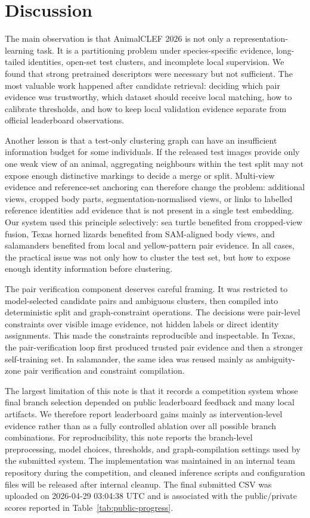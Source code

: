 \documentclass{ceurart}
\begin{document}
\section{Discussion}
The main observation is that AnimalCLEF 2026 is not only a representation-learning task. It is a partitioning problem under species-specific evidence, long-tailed identities, open-set test clusters, and incomplete local supervision. We found that strong pretrained descriptors were necessary but not sufficient. The most valuable work happened after candidate retrieval: deciding which pair evidence was trustworthy, which dataset should receive local matching, how to calibrate thresholds, and how to keep local validation evidence separate from official leaderboard observations.

Another lesson is that a test-only clustering graph can have an insufficient information budget for some individuals. If the released test images provide only one weak view of an animal, aggregating neighbours within the test split may not expose enough distinctive markings to decide a merge or split. Multi-view evidence and reference-set anchoring can therefore change the problem: additional views, cropped body parts, segmentation-normalised views, or links to labelled reference identities add evidence that is not present in a single test embedding. Our system used this principle selectively: sea turtle benefited from cropped-view fusion, Texas horned lizards benefited from SAM-aligned body views, and salamanders benefited from local and yellow-pattern pair evidence. In all cases, the practical issue was not only how to cluster the test set, but how to expose enough identity information before clustering.

The pair verification component deserves careful framing. It was restricted to model-selected candidate pairs and ambiguous clusters, then compiled into deterministic split and graph-constraint operations. The decisions were pair-level constraints over visible image evidence, not hidden labels or direct identity assignments. This made the constraints reproducible and inspectable. In Texas, the pair-verification loop first produced trusted pair evidence and then a stronger self-training set. In salamander, the same idea was reused mainly as ambiguity-zone pair verification and constraint compilation.

The largest limitation of this note is that it records a competition system whose final branch selection depended on public leaderboard feedback and many local artifacts. We therefore report leaderboard gains mainly as intervention-level evidence rather than as a fully controlled ablation over all possible branch combinations. For reproducibility, this note reports the branch-level preprocessing, model choices, thresholds, and graph-compilation settings used by the submitted system. The implementation was maintained in an internal team repository during the competition, and cleaned inference scripts and configuration files will be released after internal cleanup. The final submitted CSV was uploaded on 2026-04-29 03:04:38 UTC and is associated with the public/private scores reported in Table~\ref{tab:public-progress}.
\end{document}
